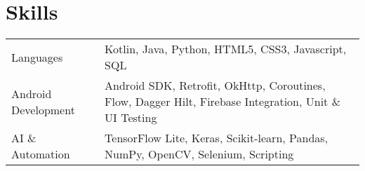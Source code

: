 \documentclass[a4paper,12pt]{article}
\begin{document}

\section{Skills}
\begin{tabularx}{\linewidth}{@{}l X@{}}
	Languages           & \normalsize{Kotlin, Java, Python, HTML5, CSS3, Javascript, SQL}                                                     \\
	Android Development & \normalsize{Android SDK, Retrofit, OkHttp, Coroutines, Flow, Dagger Hilt, Firebase Integration, Unit \& UI Testing} \\
	AI \& Automation    & \normalsize{TensorFlow Lite, Keras, Scikit-learn, Pandas, NumPy, OpenCV, Selenium, Scripting}                       \\
\end{tabularx}

\vfill
{}
\end{document}

